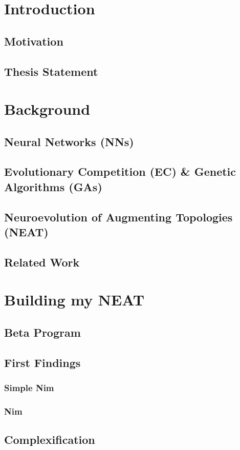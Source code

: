 \documentclass[11pt, a4paper, notitlepage]{report}
\begin{document}
    \chapter{Introduction}
        \section{Motivation}
        \section{Thesis Statement}
    \chapter{Background}
        \section{Neural Networks (NNs)}
        \section{Evolutionary Competition (EC) \& Genetic Algorithms (GAs)}
        \section{Neuroevolution of Augmenting Topologies (NEAT)}
        \section{Related Work}
    \chapter{Building my NEAT}
        \section{Beta Program}
        \section{First Findings}
            \subsection{Simple Nim}
            \subsection{Nim}
        \section{Complexification}
\end{document}
